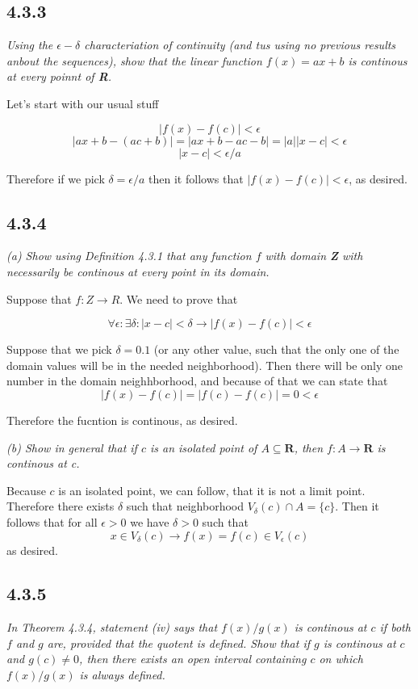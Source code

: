 \documentclass[11pt,oneside,titlepage]{book}
\begin{document}
\subsection*{4.3.3}
\textit{Using the $\epsilon-\delta$ characteriation of continuity (and tus using no previous results anbout the sequences), show that the linear function $f(x) = ax + b$ is continous at every poinnt of \textbf{R}.}

Let's start with our usual stuff

$$ |f(x) - f(c)| < \epsilon $$
$$ |ax + b - (ac + b)| = |ax + b - ac - b| = |a||x - c| < \epsilon $$
$$|x - c| < \epsilon / a $$

Therefore if we pick $\delta = \epsilon / a$ then it follows that $|f(x) - f(c)| < \epsilon$, as desired.

\subsection*{4.3.4}
\textit{(a) Show using Definition 4.3.1 that any function $f$ with domain
  \textbf{Z} with necessarily be continous at every point in its domain.}

Suppose that $f: Z \to R$. We need to prove that 

$$\forall \epsilon: \exists \delta: |x - c| < \delta \to |f(x) - f(c)| < \epsilon $$

Suppose that we pick $\delta = 0.1$ (or any other value, such that the only one
of the domain values will be in the needed neighborhood). Then there will be
only one number in the domain neighhborhood, and because of that we can state
that
$$|f(x) - f(c)| = |f(c) - f(c)|  = 0 < \epsilon$$

Therefore the fucntion is continous, as desired.

\textit{(b) Show in general that if $c$ is an isolated point of $A \subseteq \textbf{R}$, then $f: A \to \textbf{R}$ is continous at c.}

Because $c$ is an isolated point,  we can follow, that it is not a limit
point. Therefore there exists $\delta$ such that neighborhood
$V_\delta(c) \cap A = \{c\}$. Then it follows that
for all $\epsilon > 0$ we have $\delta > 0$ such that
$$x \in V_\delta(c) \to f(x) = f(c) \in V_\epsilon(c)$$
as desired.

\subsection*{4.3.5}
\textit{In Theorem 4.3.4, statement (iv) says that $f(x) / g(x)$ is continous
  at $c$ if both $f$ and $g$ are, provided that the quotent is defined. Show
  that if $g$ is continous at $c$ and $g(c) \neq 0$, then there exists an open
  interval containing $c$ on which $f(x) / g(x)$ is always defined.}
\end{document}
